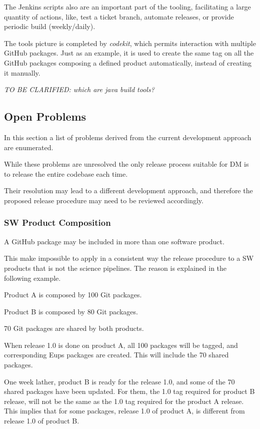 The Jenkins scripts also are an important part of the tooling, facilitating a large quantity of actions, like, test a ticket branch, automate releases, or provide periodic build (weekly/daily).

The tools picture is completed by \textit{codekit}, which permits interaction with multiple GitHub packages.
Just as an example, it is used to create the same tag on all the GitHub packages composing a defined product automatically, instead of creating it manually.

\textit{TO BE CLARIFIED: which are java build tools?}


\subsection{Open Problems} \label{sec:openProblems}

In this section a list of problems derived from the current development approach are enumerated. 

While these problems are unresolved the only release process suitable for DM is to release the entire codebase each time.

Their resolution may lead to a different development approach, and therefore the proposed release procedure may need to be reviewed accordingly.


\subsubsection{SW Product Composition} \label{sec:problemId}

A GitHub package may be included in more than one software product.

This make impossible to apply in a consistent way the release procedure to a SW products that is not the science pipelines.
The reason is explained in the following example.

Product A is composed by 100 Git packages.

Product B is composed by 80 Git packages.

70 Git packages are shared by both products.

When release 1.0 is done on product A, all 100 packages will be tagged, and corresponding Eups packages are created. This will include the 70 shared packages.

One week lather, product B is ready for the release 1.0, and some of the 70 shared packages have been updated.
For them, the 1.0 tag required for product B release, will not be the same as the 1.0 tag required for the product A release.
This implies that for some packages, release 1.0 of product A, is different from release 1.0 of product B.

